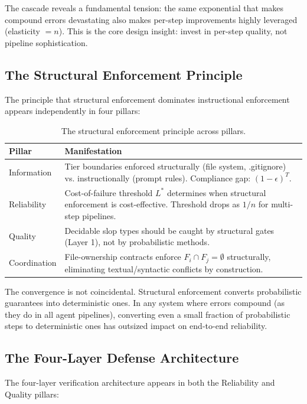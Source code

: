 \documentclass[11pt, a4paper, logo, copyright]{googledeepmind}
\begin{document}
The cascade reveals a fundamental tension: the same exponential that makes compound errors devastating also makes per-step improvements highly leveraged (elasticity $= n$). This is the core design insight: invest in per-step quality, not pipeline sophistication.

\subsection{The Structural Enforcement Principle}

The principle that structural enforcement dominates instructional enforcement appears independently in four pillars:

\begin{table}[h]
\centering
\caption{The structural enforcement principle across pillars.}
\label{tab:structural}
\begin{tabular}{lp{10cm}}
\toprule
\textbf{Pillar} & \textbf{Manifestation} \\
\midrule
Information & Tier boundaries enforced structurally (file system, .gitignore) vs. instructionally (prompt rules). Compliance gap: $(1-\epsilon)^T$. \\
Reliability & Cost-of-failure threshold $L^*$ determines when structural enforcement is cost-effective. Threshold drops as $1/n$ for multi-step pipelines. \\
Quality & Decidable slop types should be caught by structural gates (Layer 1), not by probabilistic methods. \\
Coordination & File-ownership contracts enforce $F_i \cap F_j = \emptyset$ structurally, eliminating textual/syntactic conflicts by construction. \\
\bottomrule
\end{tabular}
\end{table}

The convergence is not coincidental. Structural enforcement converts probabilistic guarantees into deterministic ones. In any system where errors compound (as they do in all agent pipelines), converting even a small fraction of probabilistic steps to deterministic ones has outsized impact on end-to-end reliability.

\subsection{The Four-Layer Defense Architecture}

The four-layer verification architecture appears in both the Reliability and Quality pillars:
\end{document}
